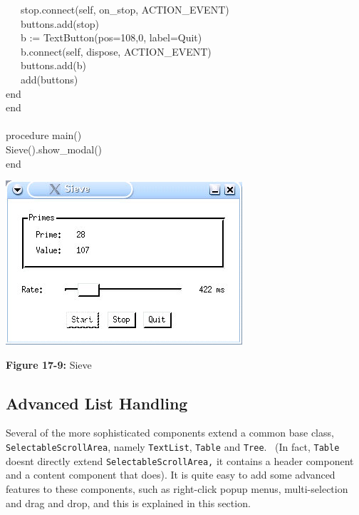 {\>   \ \ \ stop.connect(self, {\textquotedbl}on\_stop{\textquotedbl},
ACTION\_EVENT) \\
\>   \ \ \ buttons.add(stop) \\
\>   \ \ \ b := TextButton({\textquotedbl}pos=108,0{\textquotedbl},
{\textquotedbl}label=Quit{\textquotedbl}) \\
\>   \ \ \ b.connect(self, {\textquotedbl}dispose{\textquotedbl},
ACTION\_EVENT) \\
\>   \ \ \ buttons.add(b) \\
\>   \ \ \ add(buttons) \\
\>   end \\
end \\
\ \\
procedure main() \\
\>   Sieve().show\_modal() \\
end
}

\bigskip

\begin{center}
\includegraphics[width=3.4575in,height=2.3953in]{ub-img/ub-img58.jpg}
\end{center}

{\sffamily\bfseries Figure 17-9:}
{\sffamily Sieve}

\subsection{Advanced List Handling}

Several of the more sophisticated components extend a common base class,
\texttt{SelectableScrollArea}, namely \texttt{TextList}, \texttt{Table}
and \texttt{Tree}. \ (In fact, \texttt{Table} doesn{\textquotesingle}t
directly extend \texttt{SelectableScrollArea,} it contains a header
component and a content component that does). It is quite easy to add
some advanced features to these components, such as right-click popup
menus, multi-selection and drag and drop, and this is explained in this
section.

